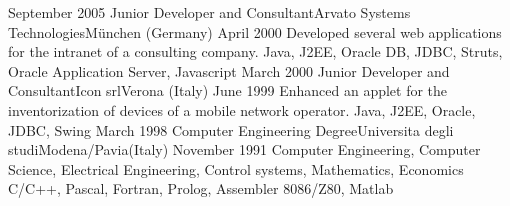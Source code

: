 \begin{experiences}
  \emptySeparator
  \consultantexperience
  {September 2005}   {Junior Developer and Consultant}{Arvato Systems Technologies}{München (Germany)}
  {April 2000}       {Developed several web applications for the intranet of a consulting company.}
                     {Java, J2EE, Oracle DB, JDBC, Struts, Oracle Application Server, Javascript}
  \emptySeparator
  \consultantexperience
  {March 2000}  	{Junior Developer and Consultant}{Icon srl}{Verona (Italy)}
  {June 1999}   	{Enhanced an applet for the inventorization of devices of a mobile network operator.}
                	{Java, J2EE, Oracle, JDBC, Swing} 
   \emptySeparator
  \consultantexperience
  {March 1998}  	{Computer Engineering Degree}{Universita degli studi}{Modena/Pavia(Italy)}
  {November 1991}   {Computer Engineering, Computer Science, Electrical Engineering, Control systems, Mathematics, Economics}
                	{C/C++, Pascal, Fortran, Prolog, Assembler 8086/Z80, Matlab}   
\end{experiences}

